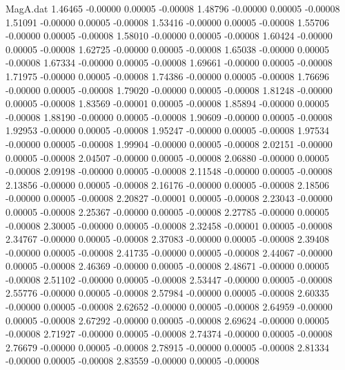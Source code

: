 \begin{filecontents}{MagA.dat}
   1.46465   -0.00000    0.00005   -0.00008
   1.48796   -0.00000    0.00005   -0.00008
   1.51091   -0.00000    0.00005   -0.00008
   1.53416   -0.00000    0.00005   -0.00008
   1.55706   -0.00000    0.00005   -0.00008
   1.58010   -0.00000    0.00005   -0.00008
   1.60424   -0.00000    0.00005   -0.00008
   1.62725   -0.00000    0.00005   -0.00008
   1.65038   -0.00000    0.00005   -0.00008
   1.67334   -0.00000    0.00005   -0.00008
   1.69661   -0.00000    0.00005   -0.00008
   1.71975   -0.00000    0.00005   -0.00008
   1.74386   -0.00000    0.00005   -0.00008
   1.76696   -0.00000    0.00005   -0.00008
   1.79020   -0.00000    0.00005   -0.00008
   1.81248   -0.00000    0.00005   -0.00008
   1.83569   -0.00001    0.00005   -0.00008
   1.85894   -0.00000    0.00005   -0.00008
   1.88190   -0.00000    0.00005   -0.00008
   1.90609   -0.00000    0.00005   -0.00008
   1.92953   -0.00000    0.00005   -0.00008
   1.95247   -0.00000    0.00005   -0.00008
   1.97534   -0.00000    0.00005   -0.00008
   1.99904   -0.00000    0.00005   -0.00008
   2.02151   -0.00000    0.00005   -0.00008
   2.04507   -0.00000    0.00005   -0.00008
   2.06880   -0.00000    0.00005   -0.00008
   2.09198   -0.00000    0.00005   -0.00008
   2.11548   -0.00000    0.00005   -0.00008
   2.13856   -0.00000    0.00005   -0.00008
   2.16176   -0.00000    0.00005   -0.00008
   2.18506   -0.00000    0.00005   -0.00008
   2.20827   -0.00001    0.00005   -0.00008
   2.23043   -0.00000    0.00005   -0.00008
   2.25367   -0.00000    0.00005   -0.00008
   2.27785   -0.00000    0.00005   -0.00008
   2.30005   -0.00000    0.00005   -0.00008
   2.32458   -0.00001    0.00005   -0.00008
   2.34767   -0.00000    0.00005   -0.00008
   2.37083   -0.00000    0.00005   -0.00008
   2.39408   -0.00000    0.00005   -0.00008
   2.41735   -0.00000    0.00005   -0.00008
   2.44067   -0.00000    0.00005   -0.00008
   2.46369   -0.00000    0.00005   -0.00008
   2.48671   -0.00000    0.00005   -0.00008
   2.51102   -0.00000    0.00005   -0.00008
   2.53447   -0.00000    0.00005   -0.00008
   2.55776   -0.00000    0.00005   -0.00008
   2.57984   -0.00000    0.00005   -0.00008
   2.60335   -0.00000    0.00005   -0.00008
   2.62652   -0.00000    0.00005   -0.00008
   2.64959   -0.00000    0.00005   -0.00008
   2.67292   -0.00000    0.00005   -0.00008
   2.69624   -0.00000    0.00005   -0.00008
   2.71927   -0.00000    0.00005   -0.00008
   2.74374   -0.00000    0.00005   -0.00008
   2.76679   -0.00000    0.00005   -0.00008
   2.78915   -0.00000    0.00005   -0.00008
   2.81334   -0.00000    0.00005   -0.00008
   2.83559   -0.00000    0.00005   -0.00008

\end{filecontents}
